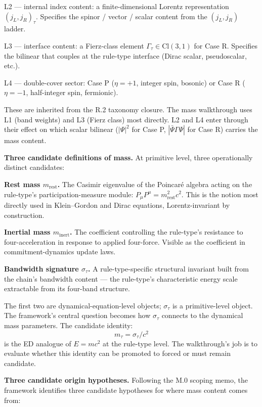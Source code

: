 \documentclass[11pt,a4paper]{article}
\begin{document}
L2 --- internal index content: a finite-dimensional Lorentz representation $(j_L, j_R)_\tau$. Specifies the spinor / vector / scalar content from the $(j_L, j_R)$ ladder.

L3 --- interface content: a Fierz-class element $\Gamma_\tau \in \mathrm{Cl}(3,1)$ for Case R. Specifies the bilinear that couples at the rule-type interface (Dirac scalar, pseudoscalar, etc.).

L4 --- double-cover sector: Case P ($\eta = +1$, integer spin, bosonic) or Case R ($\eta = -1$, half-integer spin, fermionic).

These are inherited from the R.2 taxonomy closure. The mass walkthrough uses L1 (band weights) and L3 (Fierz class) most directly. L2 and L4 enter through their effect on which scalar bilinear ($|\Psi|^2$ for Case P, $|\bar\Psi\Gamma\Psi|$ for Case R) carries the mass content.

\textbf{Three candidate definitions of mass.} At primitive level, three operationally distinct candidates:

\textbf{Rest mass $m_{\mathrm{rest}}$.} The Casimir eigenvalue of the Poincar\'e algebra acting on the rule-type's participation-measure module: $P_\mu P^\mu = m_{\mathrm{rest}}^2 c^2$. This is the notion most directly used in Klein--Gordon and Dirac equations, Lorentz-invariant by construction.

\textbf{Inertial mass $m_{\mathrm{inert}}$.} The coefficient controlling the rule-type's resistance to four-acceleration in response to applied four-force. Visible as the coefficient in commitment-dynamics update laws.

\textbf{Bandwidth signature $\sigma_\tau$.} A rule-type-specific structural invariant built from the chain's bandwidth content --- the rule-type's characteristic energy scale extractable from its four-band structure.

The first two are dynamical-equation-level objects; $\sigma_\tau$ is a primitive-level object. The framework's central question becomes how $\sigma_\tau$ connects to the dynamical mass parameters. The candidate identity:
\[
m_\tau = \sigma_\tau/c^2
\]
is the ED analogue of $E = mc^2$ at the rule-type level. The walkthrough's job is to evaluate whether this identity can be promoted to forced or must remain candidate.

\textbf{Three candidate origin hypotheses.} Following the M.0 scoping memo, the framework identifies three candidate hypotheses for where mass content comes from:
\end{document}
